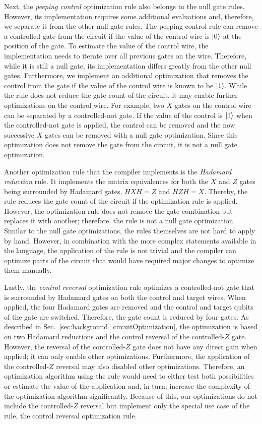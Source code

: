 Next, the \emph{peeping control} optimization rule also belongs to the null gate rules. However, its implementation requires some additional evaluations and, therefore, we separate it from the other null gate rules. The peeping control rule can remove a controlled gate from the circuit if the value of the control wire is $\ket{0}$ at the position of the gate. To estimate the value of the control wire, the implementation needs to iterate over all previous gates on the wire. Therefore, while it is still a null gate, its implementation differs greatly from the other null gates. Furthermore, we implement an additional optimization that removes the control from the gate if the value of the control wire is known to be $\ket{1}$. While the rule does not reduce the gate count of the circuit, it may enable further optimizations on the control wire. For example, two $X$ gates on the control wire can be separated by a controlled-not gate. If the value of the control is $\ket{1}$ when the controlled-not gate is applied, the control can be removed and the now successive $X$ gates can be removed with a null gate optimization. Since this optimization does not remove the gate from the circuit, it is not a null gate optimization.

Another optimization rule that the compiler implements is the \emph{Hadamard reduction} rule. It implements the matrix equivalences for both the $X$ and $Z$ gates being surrounded by Hadamard gates, $HXH = Z$ and $HZH = X$. Thereby, the rule reduces the gate count of the circuit if the optimization rule is applied. However, the optimization rule does not remove the gate combination but replaces it with another; therefore, the rule is not a null gate optimization. 
Similar to the null gate optimizations, the rules themselves are not hard to apply by hand. However, in combination with the more complex statements available in the language, the application of the rule is not trivial and the compiler can optimize parts of the circuit that would have required major changes to optimize them manually.

Lastly, the \emph{control reversal} optimization rule optimizes a controlled-not gate that is surrounded by Hadamard gates on both the control and target wires. When applied, the four Hadamard gates are removed and the control and target qubits of the gate are switched. Therefore, the gate count is reduced by four gates. As described in Sec.~\ref{sec:background_circuitOptimization}, the optimization is based on two Hadamard reductions and the control reversal of the controlled-$Z$ gate. However, the reversal of the controlled-$Z$ gate does not have any direct gain when applied; it can only enable other optimizations. Furthermore, the application of the controlled-$Z$ reversal may also disabled other optimizations. Therefore, an optimization algorithm using the rule would need to either test both possibilities or estimate the value of the application and, in turn, increase the complexity of the optimization algorithm significantly. Because of this, our optimizations do not include the controlled-$Z$ reversal but implement only the special use case of the rule, the control reversal optimization rule.

